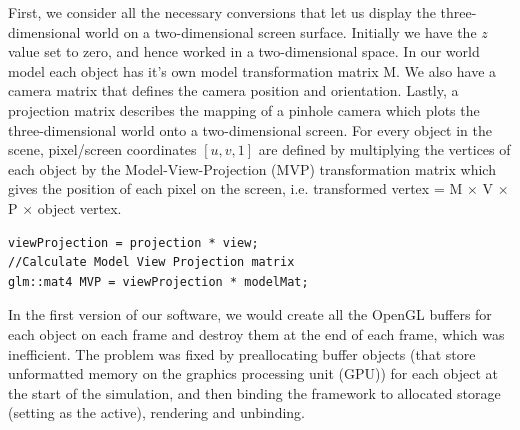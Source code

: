 \documentclass[paper=a4, fontsize=11pt]{scrartcl} %
\numberwithin{equation}{section} %
\numberwithin{figure}{section} %
\numberwithin{table}{section} %
\begin{document}
First, we consider all the necessary conversions that let us display the three-dimensional world on a two-dimensional screen surface. Initially we have the \(z\) value set to zero, and hence worked in a two-dimensional space. In our world model each object has it's own model transformation matrix M. We also have a camera matrix that defines the camera position and orientation. Lastly, a projection matrix describes the mapping of a pinhole camera which plots the three-dimensional world onto a two-dimensional screen. For every object in the scene, pixel/screen coordinates \([u, v, 1]\) are defined by multiplying the vertices of each object by the Model-View-Projection (MVP) transformation matrix which gives the position of each pixel on the screen, i.e. transformed vertex = M \(\times\) V \(\times\) P \(\times\) object vertex. \\


\lstset{
  frame=top,frame=bottom,
  basicstyle=\small\normalfont\sffamily,
  }
\begin{lstlisting}[float,caption=Renderer MVP calculation, label={lst:renderer}]
viewProjection = projection * view;
//Calculate Model View Projection matrix
glm::mat4 MVP = viewProjection * modelMat;
\end{lstlisting}


In the first version of our software, we would create all the OpenGL buffers for each object on each frame and destroy them at the end of each frame, which was inefficient. The problem was fixed by preallocating buffer objects (that store unformatted memory on the graphics processing unit (GPU)) for each object at the start of the simulation, and then binding the framework to allocated storage (setting as the active), rendering and unbinding. \\

\end{document}
